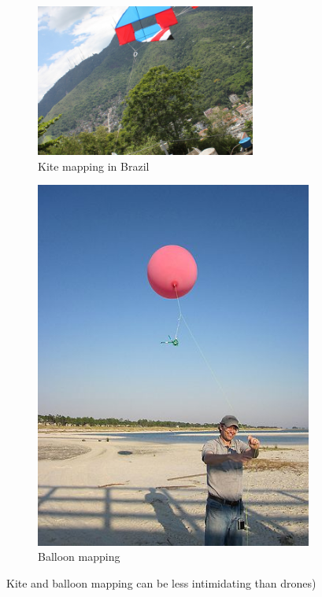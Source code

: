 \documentclass[a4paper,12pt,twoside]{article}
\begin{document}
\begin{figure}[H]
\begin{subfigure}{0.5\textwidth}
\includegraphics[width=0.9\linewidth, height=5cm]{images/Kite_mapping_in_Brazil.jpeg} 
\caption{Kite mapping in Brazil}
\label{fig:kite mapping}
\end{subfigure}
\begin{subfigure}{0.5\textwidth}
\includegraphics[width=0.9\linewidth]{images/Balloon_mapping.jpg}
\caption{Balloon mapping}
\label{fig:balloon mapping}
\end{subfigure}
\caption{Kite and balloon mapping can be less intimidating than drones)}
\label{fig:image2}
\end{figure}
\end{document}
